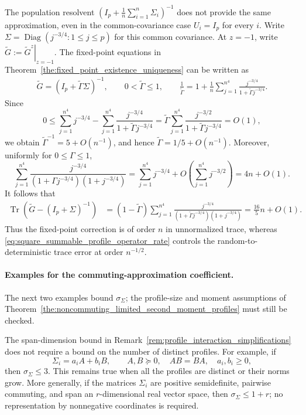 \documentclass[EJP, preprint, NODS, nobera, nofontexpansion]{ejpecp}
\DeclareMathOperator{\tr}{Tr}
\DeclareMathOperator{\diag}{Diag}
\begin{document}
\begin{example}
The population resolvent $(I_p+\frac1n \sum_{i=1}^n\Sigma_i)^{-1}$ does not provide the same approximation, even
in the common-covariance case $U_i=I_p$ for every $i$.
Write $\Sigma=\diag(j^{-3/4}:1\leq j\leq p)$ for this common covariance.
At $z=-1$, write $\tilde G:=\left.\tilde G^z\right|_{z=-1}$.
The fixed-point equations in
Theorem~\ref{the:fixed_point_existence_uniqueness} can be written as
\begin{align*}
    \tilde G
    =(I_p+\tilde\Gamma\Sigma)^{-1},
    \qquad 0<\tilde\Gamma\leq1,
    \qquad 
    \frac1{\tilde\Gamma}
    =1+\frac1n\sum_{j=1}^{n^4}
       \frac{j^{-3/4}}{1+\tilde\Gamma j^{-3/4}}.
\end{align*}
Since
\[
    0\leq
    \sum_{j=1}^{n^4}j^{-3/4}
    -\sum_{j=1}^{n^4}\frac{j^{-3/4}}{1+\tilde\Gamma j^{-3/4}}
    =\tilde\Gamma\sum_{j=1}^{n^4}\frac{j^{-3/2}}{1+\tilde\Gamma j^{-3/4}}
    =O(1),
\]
we obtain $\tilde\Gamma^{-1}=5+O(n^{-1})$, and hence
$\tilde\Gamma=1/5+O(n^{-1})$.
Moreover, uniformly for $0\leq\Gamma\leq1$,
\[
    \sum_{j=1}^{n^4}
    \frac{j^{-3/4}}{(1+\Gamma j^{-3/4})(1+j^{-3/4})}
    =\sum_{j=1}^{n^4}j^{-3/4}
      +O\!\left(\sum_{j=1}^{n^4}j^{-3/2}\right)
    =4n+O(1).
\]
It follows that
\begin{align*}
    \tr\!\left(
        \tilde G-(I_p+\Sigma)^{-1}
    \right)
    &=(1-\tilde\Gamma)\sum_{j=1}^{n^4}
      \frac{j^{-3/4}}{(1+\tilde\Gamma j^{-3/4})(1+j^{-3/4})}
    =\frac{16}{5}n+O(1).
\end{align*}
Thus the fixed-point correction is of order $n$ in unnormalized trace,
whereas \eqref{eq:square_summable_profile_operator_rate} controls the
random-to-deterministic trace error at order $n^{-1/2}$.
\end{example}


\paragraph{Examples for the commuting-approximation coefficient.}
The next two examples bound $\sigma_\Sigma$; the profile-size and
moment assumptions of Theorem~\ref{the:noncommuting_limited_second_moment_profiles} must still be checked.

\begin{example}
\label{exa:profile_commuting_low_dimension}
The span-dimension bound in
Remark~\ref{rem:profile_interaction_simplifications} does not require a
bound on the number of distinct profiles.  For example, if
\[
    \Sigma_i=a_iA+b_iB,
    \qquad
    A,B\succeq0,\quad AB=BA,\quad a_i,b_i\geq0,
\]
then $\sigma_\Sigma\leq3$.  This remains true when all the profiles are
distinct or their norms grow. More generally, if the matrices $\Sigma_i$
are positive semidefinite, pairwise commuting, and span an $r$-dimensional
real vector space, then $\sigma_\Sigma\leq1+r$; no representation by
nonnegative coordinates is required.
\end{example}
\end{document}
